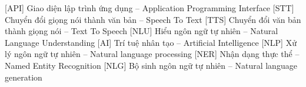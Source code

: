  [API]   {Giao diện lập trình ứng dụng -- Application Programming Interface}
 [STT]   {Chuyển đổi giọng nói thành văn bản -- Speech To Text}
 [TTS]   {Chuyển đổi văn bản thành giọng nói -- Text To Speech}
 [NLU]   {Hiểu ngôn ngữ tự nhiên -- Natural Language Understanding}
  [AI]    {Trí tuệ nhân tạo -- Artificial Intelligence}
 [NLP]    {Xử lý ngôn ngữ tự nhiên -- Natural language processing}
 [NER]    {Nhận dạng thực thể -- Named Entity Recognition}
 [NLG]    {Bộ sinh ngôn ngữ tự nhiên -- Natural language generation}
